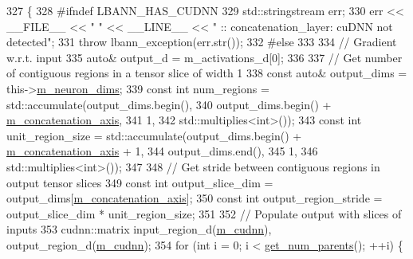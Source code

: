 \begin{DoxyCode}
327                         \{
328 \textcolor{preprocessor}{  #ifndef LBANN\_HAS\_CUDNN}
329     std::stringstream err;
330     err << \_\_FILE\_\_ << \textcolor{stringliteral}{" "} << \_\_LINE\_\_ << \textcolor{stringliteral}{" :: concatenation\_layer: cuDNN not detected"};
331     \textcolor{keywordflow}{throw} lbann\_exception(err.str());
332 \textcolor{preprocessor}{  #else}
333 
334     \textcolor{comment}{// Gradient w.r.t. input}
335     \textcolor{keyword}{auto}& output\_d = m\_activations\_d[0];
336 
337     \textcolor{comment}{// Get number of contiguous regions in a tensor slice of width 1}
338     \textcolor{keyword}{const} \textcolor{keyword}{auto}& output\_dims = this->\hyperlink{classlbann_1_1Layer_abb34bb8031f57a483e2e327a5f229f48}{m\_neuron\_dims};
339     \textcolor{keyword}{const} \textcolor{keywordtype}{int} num\_regions = std::accumulate(output\_dims.begin(),
340                                             output\_dims.begin() + 
      \hyperlink{classlbann_1_1concatenation__layer_a4ac4a931dc85d622e9ea8fddb9625d38}{m\_concatenation\_axis},
341                                             1,
342                                             std::multiplies<int>());
343     \textcolor{keyword}{const} \textcolor{keywordtype}{int} unit\_region\_size = std::accumulate(output\_dims.begin() + 
      \hyperlink{classlbann_1_1concatenation__layer_a4ac4a931dc85d622e9ea8fddb9625d38}{m\_concatenation\_axis} + 1,
344                                                  output\_dims.end(),
345                                                  1,
346                                                  std::multiplies<int>());
347 
348     \textcolor{comment}{// Get stride between contiguous regions in output tensor slices}
349     \textcolor{keyword}{const} \textcolor{keywordtype}{int} output\_slice\_dim = output\_dims[\hyperlink{classlbann_1_1concatenation__layer_a4ac4a931dc85d622e9ea8fddb9625d38}{m\_concatenation\_axis}];
350     \textcolor{keyword}{const} \textcolor{keywordtype}{int} output\_region\_stride = output\_slice\_dim * unit\_region\_size;
351     
352     \textcolor{comment}{// Populate output with slices of inputs}
353     cudnn::matrix input\_region\_d(\hyperlink{classlbann_1_1Layer_a08dbb94239e3b8c96329786c57c72e21}{m\_cudnn}), output\_region\_d(\hyperlink{classlbann_1_1Layer_a08dbb94239e3b8c96329786c57c72e21}{m\_cudnn});
354     \textcolor{keywordflow}{for} (\textcolor{keywordtype}{int} i = 0; i < \hyperlink{classlbann_1_1Layer_ac9290d4a6453ccda5f6b4d8b57b49ba3}{get\_num\_parents}(); ++i) \{

\end{DoxyCode}
